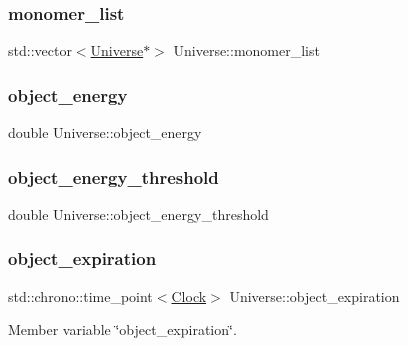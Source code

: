\subsubsection{\texorpdfstring{monomer\+\_\+list}{monomer\_list}}
{\footnotesize\ttfamily std\+::vector$<$\mbox{\hyperlink{classUniverse}{Universe}}$\ast$$>$ Universe\+::monomer\+\_\+list\hspace{0.3cm}{\ttfamily [protected]}}

\mbox{\label{classUniverse_ab64777e25c83216e7a91d2761a10463c}} 
\subsubsection{\texorpdfstring{object\+\_\+energy}{object\_energy}}
{\footnotesize\ttfamily double Universe\+::object\+\_\+energy}

\mbox{\label{classUniverse_a17c8d799331a5b32837f285c12cbe858}} 
\subsubsection{\texorpdfstring{object\+\_\+energy\+\_\+threshold}{object\_energy\_threshold}}
{\footnotesize\ttfamily double Universe\+::object\+\_\+energy\+\_\+threshold}

\mbox{\label{classUniverse_aacac76865f3600d5f308b83db9809184}} 
\subsubsection{\texorpdfstring{object\+\_\+expiration}{object\_expiration}}
{\footnotesize\ttfamily std\+::chrono\+::time\+\_\+point$<$\mbox{\hyperlink{universe_8h_a0ef8d951d1ca5ab3cfaf7ab4c7a6fd80}{Clock}}$>$ Universe\+::object\+\_\+expiration\hspace{0.3cm}{\ttfamily [private]}}



Member variable \char`\"{}object\+\_\+expiration\char`\"{}. 

